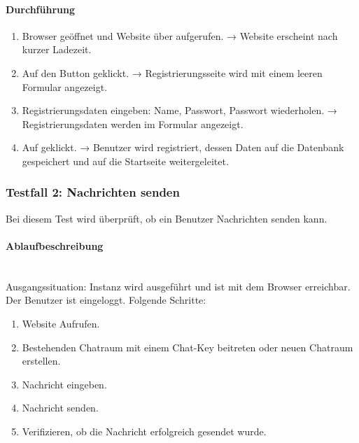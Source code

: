 \paragraph{Durchführung}
\begin{enumerate}
  \item Browser geöffnet und Website über  aufgerufen. \newline
  → Website erscheint nach kurzer Ladezeit.
  \item Auf den Button  geklickt. \newline
  → Registrierungsseite wird mit einem leeren Formular angezeigt.
  \item Registrierungsdaten eingeben: Name, Passwort, Passwort wiederholen. \newline
  → Registrierungsdaten werden im Formular angezeigt.
  \item Auf  geklickt. \newline
  → Benutzer wird registriert, dessen Daten auf die Datenbank gespeichert und auf die Startseite weitergeleitet.
\end{enumerate}

\subsubsection{Testfall 2: Nachrichten senden}
Bei diesem Test wird überprüft, ob ein Benutzer Nachrichten senden kann.
\paragraph{Ablaufbeschreibung} \mbox{}\\
Ausgangssituation: Instanz wird ausgeführt und ist mit dem Browser erreichbar. Der Benutzer ist eingeloggt. Folgende Schritte: 

\begin{enumerate}
  \item Website Aufrufen.
  \item Bestehenden Chatraum mit einem Chat-Key beitreten oder neuen Chatraum erstellen.
  \item Nachricht eingeben.
  \item Nachricht senden.
  \item Verifizieren, ob die Nachricht erfolgreich gesendet wurde.
\end{enumerate}

